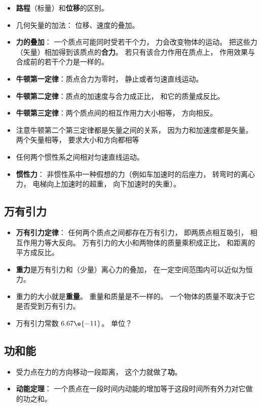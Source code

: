 \begin{itemize}
\item \textbf{路程}（标量）和\textbf{位移}的区别。
\item 几何矢量的加法： 位移、速度的叠加。
\item \textbf{力的叠加}： 一个质点可能同时受若干个力， 力会改变物体的运动。 把这些力（矢量）相加得到该质点的\textbf{合力}。 若只有该合力作用在质点上， 作用效果与合成前的若干个力是一样的。
\item \textbf{牛顿第一定律}：质点合力为零时， 静止或者匀速直线运动。
\item \textbf{牛顿第二定律}：质点的加速度与合力成正比， 和它的质量成反比。
\item \textbf{牛顿第三定律}：两个质点间的相互作用力大小相等， 方向相反。
\item 注意牛顿第二个第三定律都是矢量之间的关系， 因为力和加速度都是矢量。 两个矢量相等， 要求大小和方向都相等
\item 任何两个惯性系之间相对匀速直线运动。
\item \textbf{惯性力}： 非惯性系中一种假想的力（例如车加速时的后座力， 转弯时的离心力， 电梯向上加速时的超重， 向下加速时的失重）。
\end{itemize}

\subsection{万有引力}
\begin{itemize}
\item \textbf{万有引力定律}： 任何两个质点之间都存在万有引力， 即两质点相互吸引， 相互作用力等大反向。 万有引力的大小和两物体的质量乘积成正比， 和距离的平方成反比。
\item \textbf{重力}是万有引力和（少量）离心力的叠加， 在一定空间范围内可以近似为恒力。
\item 重力的大小就是\textbf{重量}。 重量和质量是不一样的。 一个物体的质量不取决于它是否受到万有引力。
\item 万有引力常数 $6.67\e{-11}$。 单位？
\end{itemize}


\subsection{功和能}
\begin{itemize}
\item 受力点在力的方向移动一段距离， 这个力就做了\textbf{功}。
\item \textbf{动能定理}： 一个质点在一段时间内动能的增加等于这段时间所有外力对它做的功之和。
\end{itemize}
